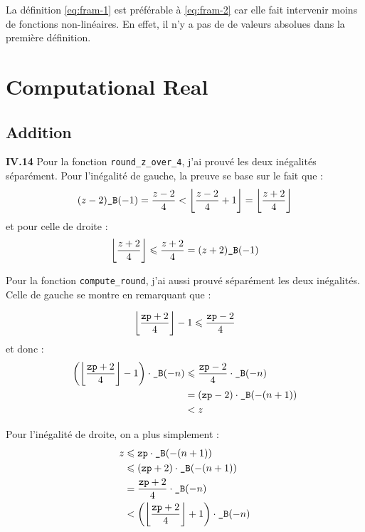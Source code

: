 \documentclass[9pt,a4paper,twocolumn]{article}
\theoremstyle{definition}
\DeclarePairedDelimiter\floor{\lfloor}{\rfloor}
\newcommand{\B}{\texttt{\_B}}
\renewcommand{\leq}{\leqslant}
\newenvironment{code}[1][ocaml]{%
\newgeometry{textwidth = 0.8\textwidth}
\VerbatimEnvironment\begin{verbatim}%
}{%
\end{verbatim}
\restoregeometry
}
\begin{document}
La définition \ref{eq:fram-1} est préférable à \ref{eq:fram-2} car elle fait
intervenir moins de fonctions non-linéaires.
En effet, il n'y a pas de de valeurs absolues dans la première définition.

\section{Computational Real}

\subsection{Addition}


\textbf{IV.14}
Pour la fonction \texttt{round\_z\_over\_4}, j'ai prouvé les deux inégalités
séparément. Pour l'inégalité de gauche, la preuve se  base sur le fait que :
$$
	(z-2)\B(-1)
	= \frac{z-2}{4}
	< \floor*{ \frac{z - 2}{4} + 1 }
	= \floor*{ \frac{z+2}{4} }
$$
et pour celle de droite :
$$
\floor*{ \frac{z + 2}{4} }
	\leq \frac{z+2}{4}
	= (z + 2)\B(-1)
$$


Pour la fonction \texttt{compute\_round}, j'ai aussi prouvé séparément les deux
inégalités.
Celle de gauche se montre en remarquant que :

$$
\floor*{\frac{\texttt{zp} + 2}{4}} - 1
\leq \frac{\texttt{zp} -2}{4}
$$
et donc :
\begin{align*}
\left(\floor*{\frac{\texttt{zp} + 2}{4}} - 1\right) \cdot \B(-n)
  &\leq \frac{\texttt{zp} -2}{4} \cdot \B(-n)\\
  &= (\texttt{zp} -2)\cdot \B(-(n+1))\\
  &< z
\end{align*}

Pour l'inégalité de droite, on a plus simplement :
\begin{align*}
z &\leq \texttt{zp}\cdot\B(-(n+1)) \\
  &\leq (\texttt{zp}+2)\cdot\B(-(n+1)) \\
  &= \frac{\texttt{zp}+2}{4}\cdot\B(-n)\\
  &< \left(\floor*{\frac{\texttt{zp} + 2}{4}} + 1\right) \cdot \B(-n)\\
\end{align*}
\end{document}

